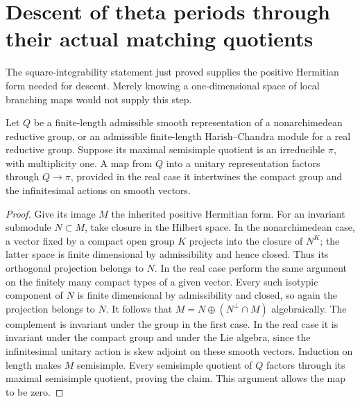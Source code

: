 
\section{Descent of theta periods through their actual matching quotients}
\label{sec:sr-theta-quotient-descent}

The square-integrability statement just proved supplies the positive
Hermitian form needed for descent. Merely knowing a one-dimensional
space of local branching maps would not supply this step.

\begin{srlemma}
\label{lem:sr-theta-unitary-head}
Let \(Q\) be a finite-length admissible smooth representation of a
nonarchimedean reductive group, or an admissible finite-length
Harish--Chandra module for a real reductive group. Suppose its maximal
semisimple quotient is an irreducible \(\pi\), with multiplicity one.
A map from \(Q\) into a unitary representation factors through
\(Q\longrightarrow\pi\), provided in the real case it intertwines
the compact group and the infinitesimal actions on smooth vectors.
\end{srlemma}

\begin{proof}
Give its image \(M\) the inherited positive Hermitian form.
For an invariant submodule \(N\subset M\), take closure in the Hilbert
space. In the nonarchimedean case, a vector fixed by a compact open
group \(K\) projects into the closure of \(N^K\); the latter space is
finite dimensional by admissibility and hence closed. Thus its
orthogonal projection belongs to \(N\). In the real case perform the
same argument on the finitely many compact types of a given vector.
Every such isotypic component of \(N\) is finite dimensional by
admissibility and closed, so again the projection belongs to \(N\).
It follows that
\(M=N\oplus(N^\perp\cap M)\) algebraically.
The complement is invariant under the group in the first case.
In the real case it is invariant under the compact group and under
the Lie algebra, since the infinitesimal unitary action is skew
adjoint on these smooth vectors.
Induction on length makes \(M\) semisimple. Every semisimple quotient
of \(Q\) factors through its maximal semisimple quotient, proving
the claim. This argument allows the map to be zero.
\end{proof}

